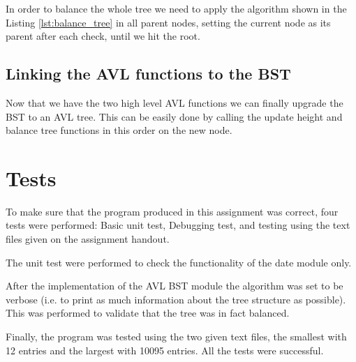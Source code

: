 \documentclass[twocolumn,10pt]{article}
\begin{document}
In order to balance the whole tree we need to apply the algorithm shown in the Listing \ref{lst:balance_tree} in all parent nodes, setting the current node as its parent after each check, until we hit the root.

\subsection{Linking the AVL functions to the BST}

Now that we have the two high level AVL functions we can finally upgrade the BST to an AVL tree. This can be easily done by calling the update height and balance tree functions in this order on the new node.

\section{Tests}

To make sure that the program produced in this assignment was correct, four tests were performed: Basic unit test, Debugging test, and testing using the text files given on the assignment handout. 

The unit test were performed to check the functionality of the date module only.

After the implementation of the AVL BST module the algorithm was set to be verbose (i.e. to print as much information about the tree structure as possible). This was performed to validate that the tree was in fact balanced.

Finally, the program was tested using the two given text files, the smallest with 12 entries and the largest with 10095 entries. All the tests were successful.
\end{document}
